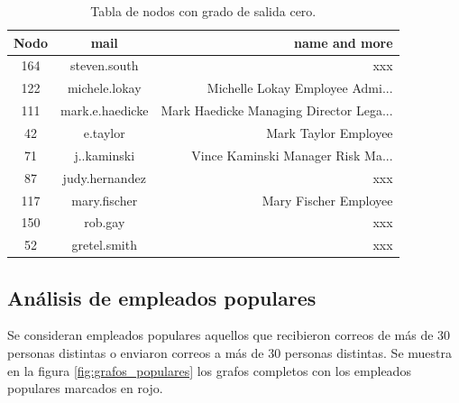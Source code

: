 \documentclass{article}
\begin{document}

\begin{table}[htb]
    \centering
    \begin{tabular}{|c|c|r|}
        \hline
        \textbf{Nodo} & \textbf{mail}   & \textbf{name and more}                  \\
        \hline
        164           & steven.south    & xxx                                     \\
        122           & michele.lokay   & Michelle Lokay Employee Admi...         \\
        111           & mark.e.haedicke & Mark Haedicke Managing Director Lega... \\
        42            & e.taylor        & Mark Taylor Employee                    \\
        71            & j..kaminski     & Vince Kaminski Manager Risk Ma...       \\
        87            & judy.hernandez  & xxx                                     \\
        117           & mary.fischer    & Mary Fischer Employee                   \\
        150           & rob.gay         & xxx                                     \\
        52            & gretel.smith    & xxx                                     \\
        \hline
    \end{tabular}
    \caption{Tabla de nodos con grado de salida cero.}
    \label{tab:out_zero}
\end{table}


\subsection{Análisis de empleados populares}
Se consideran empleados populares aquellos que recibieron correos de más de 30 personas distintas o enviaron correos a más de 30 personas distintas. Se muestra en la figura \ref{fig:grafos_populares} los grafos completos con los empleados populares marcados en rojo.
\end{document}
